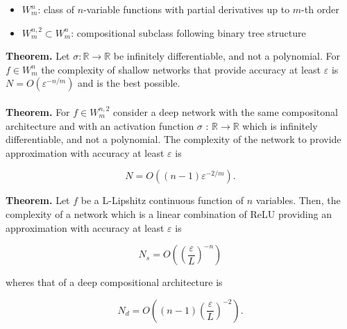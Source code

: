 \begin{itemize}
  \item $W_m^n$: class of $n$-variable functions with partial derivatives up to $m$-th order

  \item $W_m^{n,2}\subset W_m^n$: compositional subclass following binary tree structure

\end{itemize}

\textbf{Theorem.} Let $\sigma: \mathbb{R} \rightarrow \mathbb{R}$ be infinitely differentiable, and not a polynomial. For $f \in W_m^n$ the complexity of shallow networks that provide accuracy at least $\varepsilon$ is
$N=O\left(\varepsilon^{-n / m}\right)$ and is the best possible.\\ \\
\textbf{Theorem.} For $f \in W_m^{n, 2}$ consider a deep network with the same compositonal architecture and with an activation function $\sigma$ : $\mathbb{R} \rightarrow \mathbb{R}$ which is infinitely differentiable, and not a polynomial. The complexity of the network to provide approximation with accuracy at least $\varepsilon$ is

\begin{equation}
N=O\left((n-1) \varepsilon^{-2 / m}\right) .
\end{equation}

\textbf{Theorem.} Let $f$ be a L-Lipshitz continuous function of $n$ variables. Then, the complexity of a network which is a linear combination of ReLU providing an approximation with accuracy at least $\varepsilon$ is

$$
N_s=O\left(\left(\frac{\varepsilon}{L}\right)^{-n}\right)
$$

wheres that of a deep compositional architecture is

$$
N_d=O\left((n-1)\left(\frac{\varepsilon}{L}\right)^{-2}\right) .
$$

